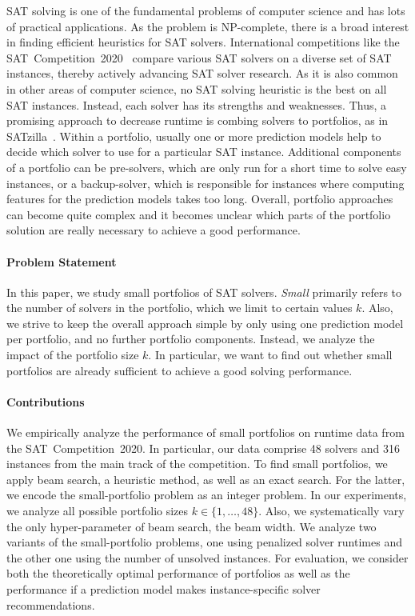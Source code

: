 \documentclass[conference]{IEEEtran}
\begin{document}
SAT solving is one of the fundamental problems of computer science and has lots of practical applications.
As the problem is NP-complete, there is a broad interest in finding efficient heuristics for SAT solvers.
International competitions like the SAT~Competition~2020~\cite{balyo2020proceedings} compare various SAT solvers on a diverse set of SAT instances, thereby actively advancing SAT solver research.
As it is also common in other areas of computer science, no SAT solving heuristic is the best on all SAT instances.
Instead, each solver has its strengths and weaknesses.
Thus, a promising approach to decrease runtime is combing solvers to portfolios, as in SATzilla~\cite{xu2008satzilla, xu2012satzilla2012}.
Within a portfolio, usually one or more prediction models help to decide which solver to use for a particular SAT instance.
Additional components of a portfolio can be pre-solvers, which are only run for a short time to solve easy instances, or a backup-solver, which is responsible for instances where computing features for the prediction models takes too long.
Overall, portfolio approaches can become quite complex and it becomes unclear which parts of the portfolio solution are really necessary to achieve a good performance.

\paragraph{Problem Statement}

In this paper, we study small portfolios of SAT solvers.
\emph{Small} primarily refers to the number of solvers in the portfolio, which we limit to certain values $k$.
Also, we strive to keep the overall approach simple by only using one prediction model per portfolio, and no further portfolio components.
Instead, we analyze the impact of the portfolio size $k$.
In particular, we want to find out whether small portfolios are already sufficient to achieve a good solving performance.

\paragraph{Contributions}

We empirically analyze the performance of small portfolios on runtime data from the SAT~Competition~2020.
In particular, our data comprise 48 solvers and 316 instances from the main track of the competition.
To find small portfolios, we apply beam search, a heuristic method, as well as an exact search.
For the latter, we encode the small-portfolio problem as an integer problem.
In our experiments, we analyze all possible portfolio sizes $k \in \{1, \dots, 48\}$.
Also, we systematically vary the only hyper-parameter of beam search, the beam width.
We analyze two variants of the small-portfolio problems, one using penalized solver runtimes and the other one using the number of unsolved instances.
For evaluation, we consider both the theoretically optimal performance of portfolios as well as the performance if a prediction model makes instance-specific solver recommendations.
\end{document}
